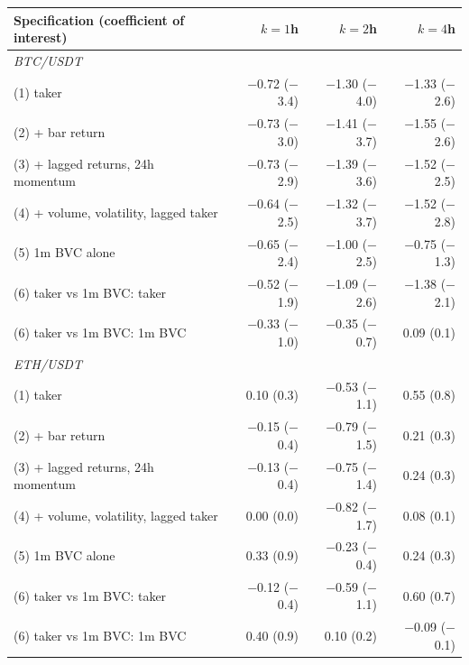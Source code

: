 \begin{tabular}{lrrr}
\toprule
Specification (coefficient of interest) & $k=1$h & $k=2$h & $k=4$h\\
\midrule
\multicolumn{4}{l}{\emph{BTC/USDT}}\\
(1) taker & \ensuremath{-}0.72 (\ensuremath{-}3.4) & \ensuremath{-}1.30 (\ensuremath{-}4.0) & \ensuremath{-}1.33 (\ensuremath{-}2.6)\\
(2) + bar return & \ensuremath{-}0.73 (\ensuremath{-}3.0) & \ensuremath{-}1.41 (\ensuremath{-}3.7) & \ensuremath{-}1.55 (\ensuremath{-}2.6)\\
(3) + lagged returns, 24h momentum & \ensuremath{-}0.73 (\ensuremath{-}2.9) & \ensuremath{-}1.39 (\ensuremath{-}3.6) & \ensuremath{-}1.52 (\ensuremath{-}2.5)\\
(4) + volume, volatility, lagged taker & \ensuremath{-}0.64 (\ensuremath{-}2.5) & \ensuremath{-}1.32 (\ensuremath{-}3.7) & \ensuremath{-}1.52 (\ensuremath{-}2.8)\\
(5) 1m BVC alone & \ensuremath{-}0.65 (\ensuremath{-}2.4) & \ensuremath{-}1.00 (\ensuremath{-}2.5) & \ensuremath{-}0.75 (\ensuremath{-}1.3)\\
(6) taker vs 1m BVC: taker & \ensuremath{-}0.52 (\ensuremath{-}1.9) & \ensuremath{-}1.09 (\ensuremath{-}2.6) & \ensuremath{-}1.38 (\ensuremath{-}2.1)\\
(6) taker vs 1m BVC: 1m BVC & \ensuremath{-}0.33 (\ensuremath{-}1.0) & \ensuremath{-}0.35 (\ensuremath{-}0.7) & 0.09 (0.1)\\
\multicolumn{4}{l}{\emph{ETH/USDT}}\\
(1) taker & 0.10 (0.3) & \ensuremath{-}0.53 (\ensuremath{-}1.1) & 0.55 (0.8)\\
(2) + bar return & \ensuremath{-}0.15 (\ensuremath{-}0.4) & \ensuremath{-}0.79 (\ensuremath{-}1.5) & 0.21 (0.3)\\
(3) + lagged returns, 24h momentum & \ensuremath{-}0.13 (\ensuremath{-}0.4) & \ensuremath{-}0.75 (\ensuremath{-}1.4) & 0.24 (0.3)\\
(4) + volume, volatility, lagged taker & 0.00 (0.0) & \ensuremath{-}0.82 (\ensuremath{-}1.7) & 0.08 (0.1)\\
(5) 1m BVC alone & 0.33 (0.9) & \ensuremath{-}0.23 (\ensuremath{-}0.4) & 0.24 (0.3)\\
(6) taker vs 1m BVC: taker & \ensuremath{-}0.12 (\ensuremath{-}0.4) & \ensuremath{-}0.59 (\ensuremath{-}1.1) & 0.60 (0.7)\\
(6) taker vs 1m BVC: 1m BVC & 0.40 (0.9) & 0.10 (0.2) & \ensuremath{-}0.09 (\ensuremath{-}0.1)\\
\bottomrule
\end{tabular}
